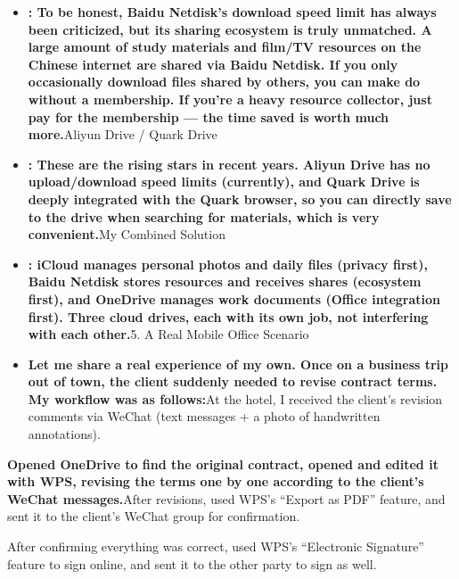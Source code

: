 \begin{itemize}
  \item \textbf{: To be honest, Baidu Netdisk's download speed limit has always been criticized, but its sharing ecosystem is truly unmatched. A large amount of study materials and film/TV resources on the Chinese internet are shared via Baidu Netdisk. If you only occasionally download files shared by others, you can make do without a membership. If you're a heavy resource collector, just pay for the membership — the time saved is worth much more.}Aliyun Drive / Quark Drive
  \item \textbf{: These are the rising stars in recent years. Aliyun Drive has no upload/download speed limits (currently), and Quark Drive is deeply integrated with the Quark browser, so you can directly save to the drive when searching for materials, which is very convenient.}My Combined Solution
  \item \textbf{: iCloud manages personal photos and daily files (privacy first), Baidu Netdisk stores resources and receives shares (ecosystem first), and OneDrive manages work documents (Office integration first). Three cloud drives, each with its own job, not interfering with each other.}5. A Real Mobile Office Scenario
  \item \textbf{Let me share a real experience of my own. Once on a business trip out of town, the client suddenly needed to revise contract terms. My workflow was as follows:}At the hotel, I received the client's revision comments via WeChat (text messages + a photo of handwritten annotations).
\end{itemize}

\textbf{Opened OneDrive to find the original contract, opened and edited it with WPS, revising the terms one by one according to the client's WeChat messages.}After revisions, used WPS's “Export as PDF” feature, and sent it to the client's WeChat group for confirmation.


After confirming everything was correct, used WPS's “Electronic Signature” feature to sign online, and sent it to the other party to sign as well.

